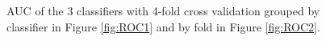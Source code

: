 \documentclass[11pt]{article}
\begin{document}
	\begin{figure}[H]%
		\centering
		\caption{\footnotesize AUC of the 3 classifiers with 4-fold cross validation grouped by classifier in Figure \ref{fig:ROC1}  and  by fold in Figure \ref{fig:ROC2}. }
		\label{fig:RealROC}
	\end{figure}
	
\end{document}
